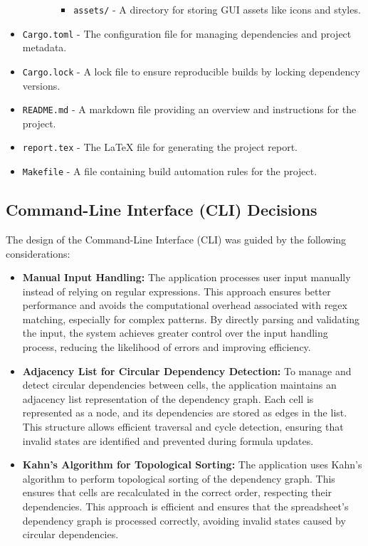 \documentclass{article}
\begin{document}
\begin{itemize}
\begin{itemize}
\begin{itemize}
\begin{itemize}
                \item \texttt{assets/} - A directory for storing GUI assets like icons and styles.
            \end{itemize}
        \end{itemize}
    \end{itemize}
    \item \texttt{Cargo.toml} - The configuration file for managing dependencies and project metadata.
    \item \texttt{Cargo.lock} - A lock file to ensure reproducible builds by locking dependency versions.
    \item \texttt{README.md} - A markdown file providing an overview and instructions for the project.
    \item \texttt{report.tex} - The LaTeX file for generating the project report.
    \item \texttt{Makefile} - A file containing build automation rules for the project.
\end{itemize}

\subsection{Command-Line Interface (CLI) Decisions}
The design of the Command-Line Interface (CLI) was guided by the following considerations:
\begin{itemize}
    \item \textbf{Manual Input Handling:} The application processes user input manually instead of relying on regular expressions. This approach ensures better performance and avoids the computational overhead associated with regex matching, especially for complex patterns. By directly parsing and validating the input, the system achieves greater control over the input handling process, reducing the likelihood of errors and improving efficiency.
    \item \textbf{Adjacency List for Circular Dependency Detection:} To manage and detect circular dependencies between cells, the application maintains an adjacency list representation of the dependency graph. Each cell is represented as a node, and its dependencies are stored as edges in the list. This structure allows efficient traversal and cycle detection, ensuring that invalid states are identified and prevented during formula updates.
    \item \textbf{Kahn's Algorithm for Topological Sorting:} The application uses Kahn's algorithm to perform topological sorting of the dependency graph. This ensures that cells are recalculated in the correct order, respecting their dependencies.
    This approach is efficient and ensures that the spreadsheet's dependency graph is processed correctly, avoiding invalid states caused by circular dependencies.
\end{itemize}
\end{document}
